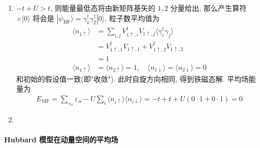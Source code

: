 \documentclass[../../main.tex]{subfiles}
\begin{document}
\begin{enumerate}
\begin{enumerate}
    \item $-t+U > t$, 则能量最低态将由新矩阵基矢的 $1,2$ 分量给出, 那么产生算符 $\times|0\rangle$ 将会是 $|\psi_{\text{HF}}\rangle = \gamma_{1}^{\dagger}\gamma_{2}^{\dagger}|0\rangle$, 粒子数平均值为
    \begin{align*}
      \langle n_{1\uparrow}\rangle &= \sum_{i,j}V_{1\uparrow,i}^{\dagger}V_{1\uparrow,j}\langle\gamma_{i}^{\dagger}\gamma_{j}\rangle\\
      &= V_{1\uparrow,1}^{\dagger}V_{1\uparrow,1} + V_{1\uparrow,2}^{\dagger}V_{1\uparrow,2} \\
      &= 1\\
      \langle n_{1\uparrow}\rangle &= \langle n_{2\uparrow}\rangle = 1,\quad \langle n_{1\downarrow}\rangle = \langle n_{2\downarrow}\rangle = 0
    \end{align*}
    和初始的假设值一致(即"收敛"). 此时自旋方向相同, 得到铁磁态解. 平均场能量为 
    \begin{align*}
      E_{\text{MF}} = \sum_{\varepsilon_{\alpha}}\varepsilon_{\alpha} - U\sum_{i}\langle n_{i\uparrow}\rangle\langle n_{i\downarrow}\rangle = -t + t + U(0\cdot 1 + 0\cdot 1) = 0
    \end{align*}

    \item 

  \end{enumerate}
\end{enumerate}

\paragraph{Hubbard 模型在动量空间的平均场}
\end{document}
